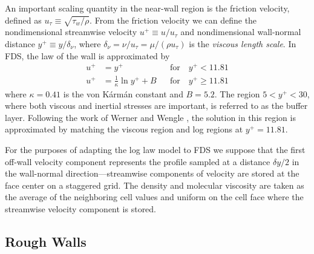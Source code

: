 An important scaling quantity in the near-wall region is the friction velocity, defined as $u_\tau \equiv \sqrt{\tau_w/\rho}$.
From the friction velocity we can define the nondimensional streamwise velocity $u^+ \equiv u/u_\tau$ and nondimensional wall-normal distance $y^+ \equiv y/\delta_\nu$, where $\delta_\nu = \nu/u_\tau = \mu/(\rho u_\tau)$ is the \emph{viscous length scale}. In FDS, the law of the wall is approximated by
\begin{align}
\label{eqn_visclayer} u^+ &= y^+                           && \mbox{for} \quad y^+ < 11.81 \\
\label{eqn_loglaw}    u^+ &= \frac{1}{\kappa} \ln y^+ + B  && \mbox{for} \quad y^+ \ge 11.81
\end{align}
where $\kappa = 0.41$ is the von K\'arm\'an constant and $B=5.2$.  The region $5 < y^+ < 30$, where both viscous and inertial stresses are important, is referred to as the buffer layer.  Following the work of Werner and Wengle \cite{Werner:1991}, the solution in this region is approximated by matching the viscous region and log regions at $y^+ = 11.81$.


For the purposes of adapting the log law model to FDS we suppose that the first off-wall velocity component represents the profile sampled at a distance $\delta y/2$ in the wall-normal direction---streamwise components of velocity are stored at the face center on a staggered grid.  The density and molecular viscosity are taken as the average of the neighboring cell values and uniform on the cell face where the streamwise velocity component is stored.

\subsection{Rough Walls}
\label{rough_wall_model}

